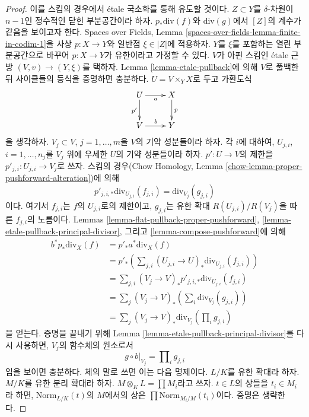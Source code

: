 \begin{proof}
이를 스킴의 경우에서 \'etale 국소화를 통해 유도할 것이다.
$Z \subset Y$를 $\delta$-차원이 $n - 1$인 정수적인 닫힌
부분공간이라 하자. $p_*\text{div}(f)$와 $\text{div}(g)$에서
$[Z]$의 계수가 같음을 보이고자 한다. Spaces over Fields, Lemma
\ref{spaces-over-fields-lemma-finite-in-codim-1}을 사상
$p : X \to Y$와 일반점 $\xi \in |Z|$에 적용하자.
$Y$를 $\xi$를 포함하는 열린 부분공간으로 바꾸어
$p : X \to Y$가 유한이라고 가정할 수 있다.
$V$가 아핀 스킴인 \'etale 근방 $(V, v) \to (Y, \xi)$를 택하자.
Lemma \ref{lemma-etale-pullback}에 의해 $V$로 풀백한 뒤 사이클들의
등식을 증명하면 충분하다. $U = V \times_Y X$로 두고 가환도식
$$
\xymatrix{
U \ar[r]_a \ar[d]_{p'} & X \ar[d]^p \\
V \ar[r]^b & Y
}
$$
을 생각하자. $V_j \subset V$, $j = 1, \ldots, m$을 $V$의 기약
성분들이라 하자. 각 $i$에 대하여,
$U_{j, i}$, $i = 1, \ldots, n_j$를 $V_j$ 위에 우세한 $U$의
기약 성분들이라 하자. $p' : U \to V$의 제한을
$p'_{j, i} : U_{j, i} \to V_j$로 쓰자. 스킴의 경우(Chow Homology,
Lemma \ref{chow-lemma-proper-pushforward-alteration})에 의해
$$
p'_{j, i, *}\text{div}_{U_{j, i}}(f_{j, i}) = \text{div}_{V_j}(g_{j, i})
$$
이다. 여기서 $f_{j, i}$는 $f$의 $U_{j, i}$로의 제한이고,
$g_{j, i}$는 유한 확대 $R(U_{j, i})/R(V_j)$을 따른
$f_{j, i}$의 노름이다. Lemmas
\ref{lemma-flat-pullback-proper-pushforward},
\ref{lemma-etale-pullback-principal-divisor}, 그리고
\ref{lemma-compose-pushforward}에 의해
\begin{align*}
b^* p_*\text{div}_X(f)
& =
p'_* a^* \text{div}_X(f) \\
& =
p'_*\left(\sum\nolimits_{j, i}
(U_{j, i} \to U)_*\text{div}_{U_{j, i}}(f_{j, i})\right) \\
& =
\sum\nolimits_{j, i}
(V_j \to V)_*p'_{j, i, *}\text{div}_{U_{j, i}}(f_{j, i}) \\
& =
\sum\nolimits_j
(V_j \to V)_*\left(\sum\nolimits_i \text{div}_{V_j}(g_{j, i})\right) \\
& =
\sum\nolimits_j (V_j \to V)_*\text{div}_{V_j}(\prod\nolimits_i g_{j, i})
\end{align*}
을 얻는다. 증명을 끝내기 위해 Lemma
\ref{lemma-etale-pullback-principal-divisor}를 다시 사용하면,
$V_j$의 함수체의 원소로서
$$
g \circ b|_{V_j} = \prod\nolimits_i g_{j, i}
$$
임을 보이면 충분하다. 체의 말로 쓰면 이는 다음 명제이다.
$L/K$를 유한 확대라 하자. $M/K$를 유한 분리 확대라 하자.
$M \otimes_K L = \prod M_i$라고 쓰자. $t \in L$의 상들을
$t_i \in M_i$라 하면, $\text{Norm}_{L/K}(t)$의 $M$에서의 상은
$\prod \text{Norm}_{M_i/M}(t_i)$이다. 증명은 생략한다.
\end{proof}

